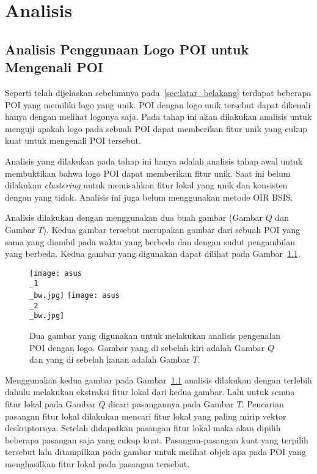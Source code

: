 \chapter{Analisis}
\label{chap:analisis}

\section{Analisis Penggunaan Logo POI untuk Mengenali POI}
Seperti telah dijelaskan sebelumnya pada~\ref{sec:latar_belakang} terdapat beberapa POI yang memiliki logo yang unik. POI dengan logo unik tersebut dapat dikenali hanya dengan melihat logonya saja. Pada tahap ini akan dilakukan analisis untuk menguji apakah logo pada sebuah POI dapat memberikan fitur unik yang cukup kuat untuk mengenali POI tersebut.

Analisis yang dilakukan pada tahap ini hanya adalah analisis tahap awal untuk membuktikan bahwa logo POI dapat memberikan fitur unik. Saat ini belum dilakukan \textit{clustering} untuk memisahkan fitur lokal yang unik dan konsisten dengan yang tidak. Analisis ini juga belum menggunakan metode OIR BSIS.

Analisis dilakukan dengan menggunakan dua buah gambar (Gambar $Q$ dan Gambar $T$). Kedua gambar tersebut merupakan gambar dari sebuah POI yang sama yang diambil pada waktu yang berbeda dan dengan sudut pengambilan yang berbeda. Kedua gambar yang digunakan dapat dilihat pada Gambar~\ref{fig:analisis_asus}. 
\begin{figure}[H]
	\centering
	\texttt{[image: asus\\\_1\\\_bw.jpg]}
	\texttt{[image: asus\\\_2\\\_bw.jpg]}
	\caption{Dua gambar yang digunakan untuk melakukan analisis pengenalan POI dengan logo. Gambar yang di sebelah kiri adalah Gambar $Q$ dan yang di sebelah kanan adalah Gambar $T$.}
	\label{fig:analisis_asus}
\end{figure}

Menggunakan kedua gambar pada Gambar~\ref{fig:analisis_asus} analisis dilakukan dengan terlebih dahulu melakukan ekstraksi fitur lokal dari kedua gambar. Lalu untuk semua fitur lokal pada Gambar $Q$ dicari pasangannya pada Gambar $T$. Pencarian pasangan fitur lokal dilakukan mencari fitur lokal yang paling mirip vektor deskriptornya. Setelah didapatkan pasangan fitur lokal maka akan dipilih beberapa pasangan saja yang cukup kuat. Pasangan-pasangan kuat yang terpilih tersebut lalu ditampilkan pada gambar untuk melihat objek apa pada POI yang menghasilkan fitur lokal pada pasangan tersebut.

